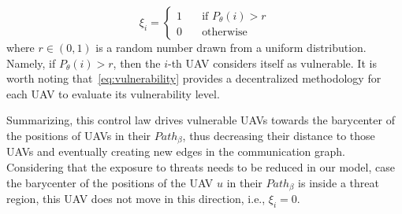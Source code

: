 \begin{equation}
\xi_i=\left\{
\begin{array}{ll}
1 \quad & \text{if } P_{\theta}(i)>r\\
0 \quad & \text{otherwise}
\end{array}\right.
\label{eq:probabilisticparam}
\end{equation}
where $r\in(0,1)$ is a random number drawn from a uniform distribution. Namely, if $P_{\theta}(i)>r$, then the $i$-th UAV considers itself as vulnerable. It is worth noting that~\eqref{eq:vulnerability} provides a decentralized methodology for each UAV to evaluate its vulnerability level.

Summarizing, this control law drives vulnerable UAVs towards the barycenter of the positions of UAVs in their $Path_{\beta}$, thus decreasing their distance to those UAVs and eventually creating new edges in the communication graph. Considering that the exposure to threats needs to be reduced in our model, case the  barycenter of the positions of the UAV $u$ in their $Path_{\beta}$ is inside a threat region, this UAV does not move in this direction, i.e., $\xi_i=0$.
